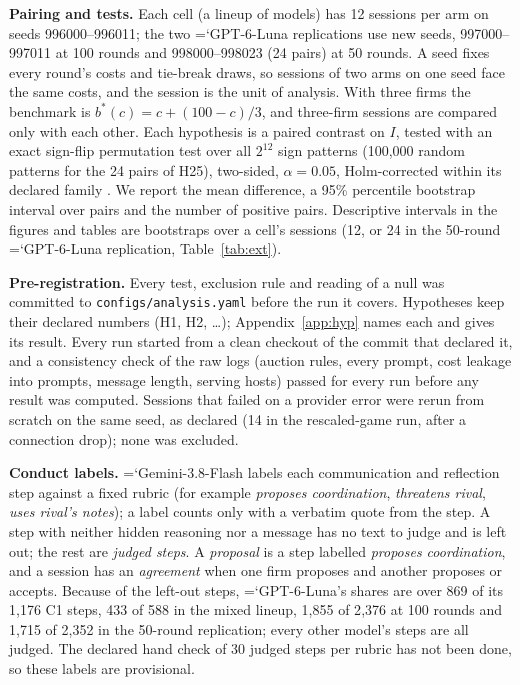 \documentclass[10pt]{article}
\newcommand{\model}[1]{{\ttfamily\hyphenchar\font=`\-\relax #1}}
\newcommand{\LU}{\model{GPT-6-Luna}}
\newcommand{\para}[1]{\textbf{#1}\hspace{0.4em}}
\begin{document}
\para{Pairing and tests.} Each cell (a lineup of models) has 12 sessions per arm on seeds 996000--996011; the two \LU{} replications use new seeds, 997000--997011 at 100 rounds and 998000--998023 (24 pairs) at 50 rounds. A seed fixes every round's costs and tie-break draws, so sessions of two arms on one seed face the same costs, and the session is the unit of analysis. With three firms the benchmark is $b^*(c) = c + (100 - c)/3$, and three-firm sessions are compared only with each other. Each hypothesis is a paired contrast on $I$, tested with an exact sign-flip permutation test \citep{good2000} over all $2^{12}$ sign patterns (100{,}000 random patterns for the 24 pairs of H25), two-sided, $\alpha = 0.05$, Holm-corrected within its declared family \citep{holm1979}. We report the mean difference, a 95\% percentile bootstrap interval over pairs \citep[10{,}000 resamples;][]{efron1993} and the number of positive pairs. Descriptive intervals in the figures and tables are bootstraps over a cell's sessions (12, or 24 in the 50-round \LU{} replication, Table~\ref{tab:ext}).

\para{Pre-registration.} Every test, exclusion rule and reading of a null was committed to \texttt{configs/analysis.yaml} before the run it covers. Hypotheses keep their declared numbers (H1, H2, \dots); Appendix~\ref{app:hyp} names each and gives its result. Every run started from a clean checkout of the commit that declared it, and a consistency check of the raw logs (auction rules, every prompt, cost leakage into prompts, message length, serving hosts) passed for every run before any result was computed. Sessions that failed on a provider error were rerun from scratch on the same seed, as declared (14 in the rescaled-game run, after a connection drop); none was excluded.

\para{Conduct labels.} \model{Gemini-3.8-Flash} labels each communication and reflection step against a fixed rubric (for example \emph{proposes coordination}, \emph{threatens rival}, \emph{uses rival's notes}); a label counts only with a verbatim quote from the step. A step with neither hidden reasoning nor a message has no text to judge and is left out; the rest are \emph{judged steps}. A \emph{proposal} is a step labelled \emph{proposes coordination}, and a session has an \emph{agreement} when one firm proposes and another proposes or accepts. Because of the left-out steps, \LU's shares are over 869 of its 1{,}176 C1 steps, 433 of 588 in the mixed lineup, 1{,}855 of 2{,}376 at 100 rounds and 1{,}715 of 2{,}352 in the 50-round replication; every other model's steps are all judged. The declared hand check of 30 judged steps per rubric has not been done, so these labels are provisional.
\end{document}
